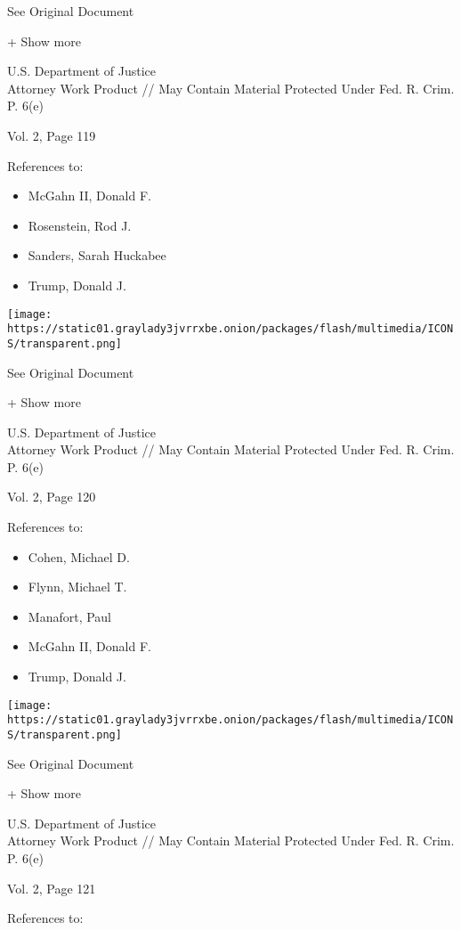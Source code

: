 See Original Document

+ Show more

U.S. Department of Justice\\
Attorney Work Product // May Contain Material Protected Under Fed. R.
Crim. P. 6(e)

Vol. 2, Page 119

References to:

\begin{itemize}
\tightlist
\item
  McGahn II, Donald F.
\item
  Rosenstein, Rod J.
\item
  Sanders, Sarah Huckabee
\item
  Trump, Donald J.
\end{itemize}

\protect\hyperlink{}{}

\texttt{[image: https://static01.graylady3jvrrxbe.onion/packages/flash/multimedia/ICONS/transparent.png]}

See Original Document

+ Show more

U.S. Department of Justice\\
Attorney Work Product // May Contain Material Protected Under Fed. R.
Crim. P. 6(e)

Vol. 2, Page 120

References to:

\begin{itemize}
\tightlist
\item
  Cohen, Michael D.
\item
  Flynn, Michael T.
\item
  Manafort, Paul 
\item
  McGahn II, Donald F.
\item
  Trump, Donald J.
\end{itemize}

\protect\hyperlink{}{}

\texttt{[image: https://static01.graylady3jvrrxbe.onion/packages/flash/multimedia/ICONS/transparent.png]}

See Original Document

+ Show more

U.S. Department of Justice\\
Attorney Work Product // May Contain Material Protected Under Fed. R.
Crim. P. 6(e)

Vol. 2, Page 121

References to:

